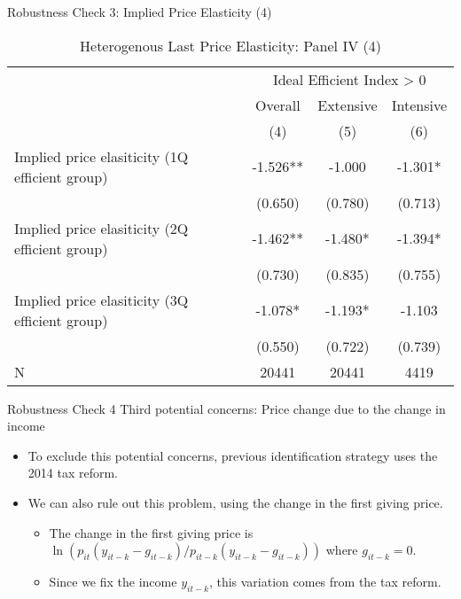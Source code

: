 \documentclass[
  ignorenonframetext,
]{beamer}
\providecommand{\tightlist}{%
  \setlength{\itemsep}{0pt}\setlength{\parskip}{0pt}}
\begin{document}
\begin{frame}{Robustness Check 3: Implied Price Elasticity (4)}
\protect\hypertarget{robustness-check-3-implied-price-elasticity-4}{}
\begin{table}

\caption{\label{tab:kableHeteroShortElasticitySlide4}Heterogenous Last Price Elasticity: Panel IV (4)}
\centering
\fontsize{8}{10}\selectfont
\begin{tabular}[t]{lccc}
\toprule
\multicolumn{1}{c}{ } & \multicolumn{3}{c}{Ideal Efficient Index > 0} \\
\cmidrule(l{3pt}r{3pt}){2-4}
\multicolumn{1}{c}{ } & \multicolumn{1}{c}{Overall} & \multicolumn{1}{c}{Extensive} & \multicolumn{1}{c}{Intensive} \\
\cmidrule(l{3pt}r{3pt}){2-2} \cmidrule(l{3pt}r{3pt}){3-3} \cmidrule(l{3pt}r{3pt}){4-4}
 & (4) & (5) & (6)\\
\midrule
Implied price elasiticity (1Q efficient group) & -1.526** & -1.000 & -1.301*\\
 & (0.650) & (0.780) & (0.713)\\
Implied price elasiticity (2Q efficient group) & -1.462** & -1.480* & -1.394*\\
 & (0.730) & (0.835) & (0.755)\\
Implied price elasiticity (3Q efficient group) & -1.078* & -1.193* & -1.103\\
 & (0.550) & (0.722) & (0.739)\\
N & 20441 & 20441 & 4419\\
\bottomrule
\end{tabular}
\end{table}
\end{frame}

\begin{frame}{Robustness Check 4}
\protect\hypertarget{robustness-check-4}{}
Third potential concerns: Price change due to the change in income

\begin{itemize}
\tightlist
\item
  To exclude this potential concerns, previous identification strategy uses the 2014 tax reform.
\item
  We can also rule out this problem, using the change in the first giving price.

  \begin{itemize}
  \tightlist
  \item
    The change in the first giving price is \(\ln(p_{it}(y_{it-k} - g_{it-k})/p_{it-k}(y_{it-k} - g_{it-k}))\) where \(g_{it-k} = 0\).
  \item
    Since we fix the income \(y_{it-k}\), this variation comes from the tax reform.
  \end{itemize}
\end{itemize}
\end{frame}
\end{document}
